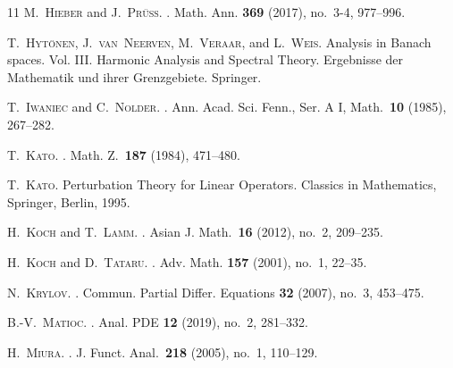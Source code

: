 \documentclass[11pt, leqno]{amsart}
\theoremstyle{definition}
\begin{document}
\begin{thebibliography}{11}
		\textsc{M.~Hieber} and \textsc{J.~Pr\"uss}.
		.
		\newblock Math. Ann. \textbf{369} (2017), no.~3-4, 977--996.


		\textsc{T.~Hyt\"{o}nen}, \textsc{J.~van~Neerven}, \textsc{M.~Veraar}, and \textsc{L.~Weis}.
		\newblock Analysis in {B}anach spaces. {V}ol. {III}. {Harmonic Analysis and Spectral Theory}. Ergebnisse der Mathematik und ihrer Grenzgebiete.
		\newblock Springer.

		\textsc{T.~Iwaniec} and \textsc{C.~Nolder}.
		.
		\newblock Ann. Acad. Sci. Fenn., Ser. A I, Math.~\textbf{10} (1985), 267--282.

		\textsc{T.~Kato}.
		.
		\newblock Math. Z.~\textbf{187} (1984), 471--480.

		\textsc{T.~Kato}.
		\newblock Perturbation {T}heory for {L}inear {O}perators. Classics in Mathematics,
		\newblock Springer, Berlin, 1995.

		\textsc{H.~Koch} and \textsc{T.~Lamm}.
		.
		\newblock Asian J. Math.~\textbf{16} (2012), no.~2, 209--235.

		\textsc{H.~Koch} and \textsc{D.~Tataru}.
		.
		\newblock Adv. Math. \textbf{157} (2001), no.~1, 22--35.

		\textsc{N.~Krylov}.
		.
		\newblock Commun. Partial Differ. Equations \textbf{32} (2007), no.~3, 453--475.



		\textsc{B.-V.~Matioc}.
		.
		\newblock Anal. PDE \textbf{12} (2019), no.~2, 281--332.

		\textsc{H.~Miura}.
		.
		\newblock J. Funct. Anal.~\textbf{218} (2005), no.~1, 110--129.


\end{thebibliography}
\end{document}
